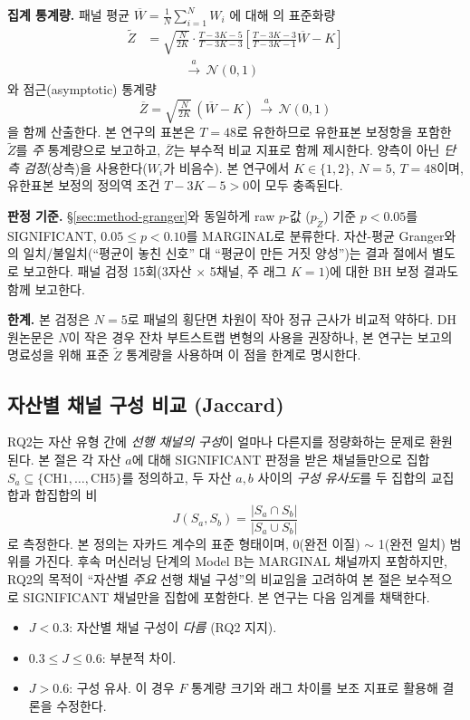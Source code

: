 \documentclass[11pt, a4paper, twocolumn]{article}
\begin{document}
\textbf{집계 통계량.} 패널 평균 $\overline{W} = \frac{1}{N}\sum_{i=1}^{N} W_i$
에 대해 \citet{dumitrescuhurlin2012}의 표준화량
\begin{equation}
  \begin{split}
  \tilde{Z} &= \sqrt{\frac{N}{2K}}\cdot
  \frac{T-3K-5}{T-3K-3}\!\left[\frac{T-3K-3}{T-3K-1}\overline{W} - K\right]\\
  &\hspace{3em}\xrightarrow{a}\,\mathcal{N}(0,1)
  \end{split}
\end{equation}
와 점근(asymptotic) 통계량
\begin{equation}
  \overline{Z} = \sqrt{\tfrac{N}{2K}}\,(\overline{W}-K)\,\xrightarrow{a}\,\mathcal{N}(0,1)
\end{equation}
을 함께 산출한다. 본 연구의 표본은 $T=48$로 유한하므로 유한표본
보정항을 포함한 $\tilde{Z}$를 \emph{주} 통계량으로 보고하고, $\overline{Z}$는
부수적 비교 지표로 함께 제시한다. 양측이 아닌 \emph{단측 검정}(상측)을
사용한다($W_i$가 비음수). 본 연구에서 $K\in\{1,2\}$, $N=5$, $T=48$이며,
유한표본 보정의 정의역 조건 $T-3K-5>0$이 모두 충족된다.

\textbf{판정 기준.} \S\ref{sec:method-granger}와 동일하게 raw $p$-값
($p_{\tilde{Z}}$) 기준 $p<0.05$를 SIGNIFICANT, $0.05\leq p<0.10$를
MARGINAL로 분류한다. 자산-평균 Granger와의 일치/불일치(``평균이
놓친 신호'' 대 ``평균이 만든 거짓 양성'')는 결과 절에서 별도로 보고한다.
패널 검정 15회(3자산 $\times$ 5채널, 주 래그 $K=1$)에 대한 BH 보정
결과도 함께 보고한다.

\textbf{한계.} 본 검정은 $N=5$로 패널의 횡단면 차원이 작아 정규
근사가 비교적 약하다. DH 원논문은 $N$이 작은 경우 잔차 부트스트랩
변형의 사용을 권장하나, 본 연구는 보고의 명료성을 위해 표준 $\tilde{Z}$
통계량을 사용하며 이 점을 한계로 명시한다.

\subsection{자산별 채널 구성 비교 (Jaccard)}\label{sec:method-jaccard}

RQ2는 자산 유형 간에 \emph{선행 채널의 구성}이 얼마나 다른지를
정량화하는 문제로 환원된다. 본 절은 각 자산 $a$에 대해 SIGNIFICANT
판정을 받은 채널들만으로 집합
$S_a \subseteq \{\mathrm{CH1},\ldots,\mathrm{CH5}\}$를 정의하고,
두 자산 $a, b$ 사이의 \emph{구성 유사도}를 두 집합의 교집합과
합집합의 비
\[
  J(S_a, S_b) = \frac{|S_a \cap S_b|}{|S_a \cup S_b|}
\]
로 측정한다. 본 정의는 자카드 계수의 표준 형태이며, 0(완전 이질) $\sim$
1(완전 일치) 범위를 가진다. 후속 머신러닝 단계의 Model B는 MARGINAL
채널까지 포함하지만, RQ2의 목적이 ``자산별 \emph{주요} 선행 채널
구성''의 비교임을 고려하여 본 절은 보수적으로 SIGNIFICANT 채널만을
집합에 포함한다. 본 연구는 다음 임계를 채택한다.
\begin{itemize}[leftmargin=1.4em, topsep=0pt, itemsep=0pt]
  \item $J < 0.3$: 자산별 채널 구성이 \emph{다름} (RQ2 지지).
  \item $0.3 \leq J \leq 0.6$: 부분적 차이.
  \item $J > 0.6$: 구성 유사. 이 경우 $F$ 통계량 크기와 래그 차이를
        보조 지표로 활용해 결론을 수정한다.
\end{itemize}
\end{document}
